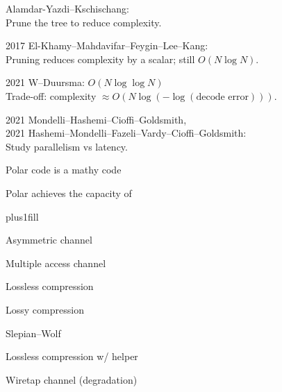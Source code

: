 \documentclass[12pt, aspectratio=169]{beamer}
\begin{document}
\begin{frame}
    \fontsize{16pt}{16pt} Alamdar-Yazdi--Kschischang: \\
	Prune the tree to reduce complexity.

    \vskip0.5cm
    
	2017 El-Khamy--Mahdavifar--Feygin--Lee--Kang: \\
    Pruning reduces complexity by a scalar; 
	still $O(N \log N)$.
    
    \vskip0.5cm

	2021 W--Duursma:
	$O(N \log \log N)$ \\
	Trade-off: complexity
    $\approx O(N\log(-\log(\text{decode error})))$.

    \vskip0.5cm

	2021 Mondelli--Hashemi--Cioffi--Goldsmith, \\
	2021 Hashemi--Mondelli--Fazeli--Vardy--Cioffi--Goldsmith: \\
    Study parallelism vs latency.
\end{frame}

\begin{frame}
    \fontsize{32pt}{0}\selectfont
    
    Polar code is a mathy code
    
    \pause
    \vfill
    
    \fontsize{28pt}{0}\selectfont
    Polar achieves the capacity of
\end{frame}

\begin{frame}
    \ifforloop
        \def\n{100}
    \else
        \def\n{10}
    \fi

    \fontsize{16pt}{0}\selectfont
    \parskip0pt plus1fill

	Asymmetric channel

	Multiple access channel

    Lossless compression

	Lossy compression

	Slepian--Wolf

	Lossless compression w/ helper

	Wiretap channel (degradation)
\end{frame}
\end{document}
